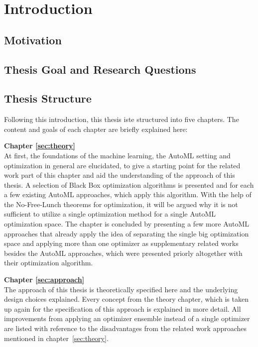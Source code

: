 %
\chapter{Introduction}
\label{sec:intro}


\section{Motivation}
\label{sec:intro:motivation}

\blindtext

\section{Thesis Goal and Research Questions}
\label{sec:intro:goal}

\blindtext

\section{Thesis Structure}
\label{sec:intro:structure}
Following this introduction, this thesis iste structured into five chapters.
The content and goals of each chapter are briefly explained here:

\textbf{Chapter \ref{sec:theory}} \\[0.2em]
At first, the foundations of the machine learning, the AutoML setting and optimization in general are elucidated, to give a starting point for the related work part of this chapter and aid the understanding of the approach of this thesis.
A selection of Black Box optimization algorithms is presented and for each a few existing AutoML approaches, which apply this algorithm.
With the help of the No-Free-Lunch theorems for optimization, it will be argued why it is not sufficient to utilize a single optimization method for a single AutoML optimization space.
The chapter is concluded by presenting a few more AutoML approaches that already apply the idea of separating the single big optimization space and applying more than one optimizer as supplementary related works besides the AutoML approaches, which were presented priorly altogether with their optimization algorithm.

\textbf{Chapter \ref{sec:approach}} \\[0.2em]
The approach of this thesis is theoretically specified here and the underlying design choices explained.
Every concept from the theory chapter, which is taken up again for the specification of this approach is explained in more detail.
All improvements from applying an optimizer ensemble instead of a single optimizer are listed with reference to the disadvantages from the related work approaches mentioned in chapter~\ref{sec:theory}.

